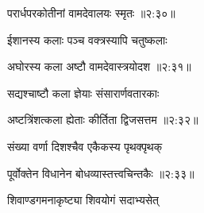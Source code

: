 
{\devanagarifont परार्धपरकोतीनां वामदेवालयः स्मृतः {॥२:३०॥} \veg\dontdisplaylinenum }%

{\devanagarifont ईशानस्य कलाः पञ्च वक्त्रस्यापि चतुष्कलाः \thinspace{\dandab} \dontdisplaylinenum }%


{\devanagarifont अघोरस्य कला अष्टौ वामदेवास्त्रयोदश {॥२:३१॥} \veg\dontdisplaylinenum }%

{\devanagarifont सद्यश्चाष्टौ कला ज्ञेयाः संसारार्णवतारकाः \thinspace{\dandab} \dontdisplaylinenum }%


{\devanagarifont अष्टत्रिंशत्कला ह्येताः कीर्तिता द्विजसत्तम {॥२:३२॥} \veg\dontdisplaylinenum }%

{\devanagarifont संख्या वर्णा दिशश्चैव एकैकस्य पृथक्पृथक् \thinspace{\dandab} \dontdisplaylinenum }%


{\devanagarifont पूर्वोक्तेन विधानेन बोधव्यास्तत्त्वचिन्तकैः {॥२:३३॥} \veg\dontdisplaylinenum }%

{\devanagarifont शिवाण्डगमनाकृष्ट्या शिवयोगं सदाभ्यसेत् \thinspace{\dandab} \dontdisplaylinenum }%

